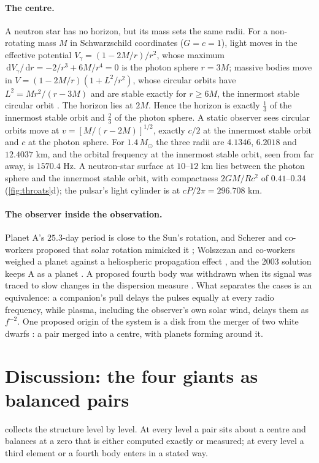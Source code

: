 \documentclass[11pt]{article}
\theoremstyle{definition}\newtheorem{definition}[theorem]{Definition}
\theoremstyle{remark}\newtheorem{remark}[theorem]{Remark}
\newcommand{\dd}{\,\mathrm d}\newcommand{\e}{\mathrm e}
\begin{document}
\paragraph{The centre.} A neutron star has no horizon, but its mass sets the same radii. For a non-rotating mass $M$ in Schwarzschild coordinates ($G=c=1$), light moves in the effective potential $V_\gamma=(1-2M/r)/r^2$, whose maximum $\dd V_\gamma/\dd r=-2/r^3+6M/r^4=0$ is the photon sphere $r=3M$; massive bodies move in $V=(1-2M/r)(1+L^2/r^2)$, whose circular orbits have $L^2=Mr^2/(r-3M)$ and are stable exactly for $r\ge6M$, the innermost stable circular orbit \cite{MTW}. The horizon lies at $2M$. Hence the horizon is exactly $\frac13$ of the innermost stable orbit and $\frac23$ of the photon sphere. A static observer sees circular orbits move at $v=[M/(r-2M)]^{1/2}$, exactly $c/2$ at the innermost stable orbit and $c$ at the photon sphere. For $1.4\,M_\odot$ the three radii are $4.1346$, $6.2018$ and $12.4037$ km, and the orbital frequency at the innermost stable orbit, seen from far away, is $1570.4$ Hz. A neutron-star surface at $10$--$12$ km lies between the photon sphere and the innermost stable orbit, with compactness $2GM/Rc^2$ of $0.41$--$0.34$ (\cref{fig:throats}d); the pulsar's light cylinder is at $cP/2\pi=296.708$ km.

\paragraph{The observer inside the observation.} Planet A's $25.3$-day period is close to the Sun's rotation, and Scherer and co-workers proposed that solar rotation mimicked it \cite{Scherer}; Wolszczan and co-workers weighed a planet against a heliospheric propagation effect \cite{W2000}, and the 2003 solution keeps A as a planet \cite{KW03}. A proposed fourth body was withdrawn when its signal was traced to slow changes in the dispersion measure \cite{W12}. What separates the cases is an equivalence: a companion's pull delays the pulses equally at every radio frequency, while plasma, including the observer's own solar wind, delays them as $f^{-2}$. One proposed origin of the system is a disk from the merger of two white dwarfs \cite{Podsi}: a pair merged into a centre, with planets forming around it.

\section{Discussion: the four giants as balanced pairs}\label{sec:discussion}
 collects the structure level by level. At every level a pair sits about a centre and balances at a zero that is either computed exactly or measured; at every level a third element or a fourth body enters in a stated way.
\end{document}
